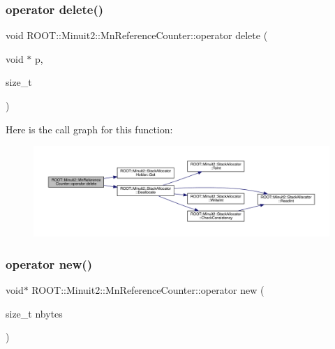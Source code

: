 \subsubsection{\texorpdfstring{operator delete()}{operator delete()}\hspace{0.1cm}{\footnotesize\ttfamily [3/3]}}
{\footnotesize\ttfamily void R\+O\+O\+T\+::\+Minuit2\+::\+Mn\+Reference\+Counter\+::operator delete (\begin{DoxyParamCaption}\item[{void $\ast$}]{p,  }\item[{size\+\_\+t}]{ }\end{DoxyParamCaption})\hspace{0.3cm}{\ttfamily [inline]}}

Here is the call graph for this function\+:
\nopagebreak
\begin{figure}[H]
\begin{center}
\leavevmode
\includegraphics[width=350pt]{dc/da2/classROOT_1_1Minuit2_1_1MnReferenceCounter_a792b5f277bb7df7c032c603eed5ae6f9_cgraph}
\end{center}
\end{figure}
\mbox{\label{classROOT_1_1Minuit2_1_1MnReferenceCounter_af7e9fdee3f67cac68328bbd05f6f2958}} 
\subsubsection{\texorpdfstring{operator new()}{operator new()}\hspace{0.1cm}{\footnotesize\ttfamily [1/3]}}
{\footnotesize\ttfamily void$\ast$ R\+O\+O\+T\+::\+Minuit2\+::\+Mn\+Reference\+Counter\+::operator new (\begin{DoxyParamCaption}\item[{size\+\_\+t}]{nbytes }\end{DoxyParamCaption})\hspace{0.3cm}{\ttfamily [inline]}}

